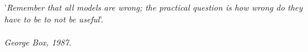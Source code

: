 
\clearpage

\narrowlinespacing

\vspace*{4mm}

'\textit{Remember that all models are wrong; the practical question is how wrong do they have to be to not be useful}'.\\
\\
\emph{George Box, 1987.}

\normallinespacing
